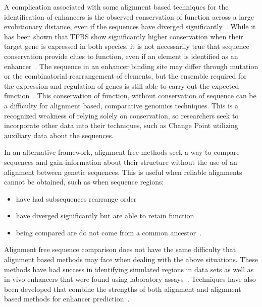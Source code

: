          A complication associated with some alignment based techniques for the identification of enhancers is the observed conservation of function across a large evolutionary distance, even if the sequences have diverged significantly~\cite{tautz2000evolution, pennacchio2013enhancers}. While it has been shown that TFBS show significantly higher conservation when their target gene is expressed in both species, it is not necessarily true that sequence conservation provide clues to function, even if an element is identified as an enhancer~\cite{hemberg2011conservation, pennacchio2013enhancers}.
         The sequence in an enhancer binding site may differ through mutation or the combinatorial rearrangement of elements, but the ensemble required for the expression and regulation of genes is still able to carry out the expected function~\cite{wong2014decoupling}. This conservation of function, without conservation of sequence can be a difficulty for alignment based, comparative genomics techniques. This is a recognized weakness of relying solely on conservation, so researchers seek to incorporate other data into their techniques, such as Change Point utilizing auxiliary data about the sequences. 
        
        In an alternative framework, alignment-free methods seek a way to compare sequences and gain information about their structure without the use of an alignment between genetic sequences. 
        This is useful when reliable alignments cannot be obtained, such as when sequence regions: 
            \begin{itemize}
                \item have had subsequences rearrange order%
                \item have diverged significantly but are able to retain function
                \item being compared are do not come from a common ancestor~\cite{song2013new}.
            \end{itemize}
        Alignment free sequence comparison does not have the same difficulty that alignment based methods may face when dealing with the above situations. These methods have had success in identifying simulated regions in data sets as well as in-vivo enhancers that were found using laboratory assays~\cite{goke2012estimation}. Techniques have also been developed that combine the strengths of both alignment and alignment based methods for enhancer prediction~\cite{dolle2015handling}. 
        
